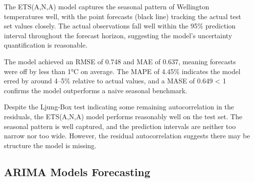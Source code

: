\documentclass[11pt, a4paper]{article}\usepackage[]{graphicx}\usepackage[]{xcolor}
\begin{document}
The ETS(A,N,A) model captures the seasonal pattern of Wellington temperatures well, with the point forecasts (black line) tracking the actual test set values closely. The actual observations fall well within the 95\% prediction interval throughout the forecast horizon, suggesting the model's uncertainty quantification is reasonable.

The model achieved an RMSE of 0.748 and MAE of 0.637, meaning forecasts were off by less than 1°C on average. The MAPE of 4.45\% indicates the model erred by around 4–5\% relative to actual values, and a MASE of 0.649 < 1 confirms the model outperforms a naive seasonal benchmark.

Despite the Ljung-Box test indicating some remaining autocorrelation in the residuals, the ETS(A,N,A) model performs reasonably well on the test set. The seasonal pattern is well captured, and the prediction intervals are neither too narrow nor too wide. However, the residual autocorrelation suggests there may be structure the model is missing.

\subsection{ARIMA Models Forecasting}
\end{document}
